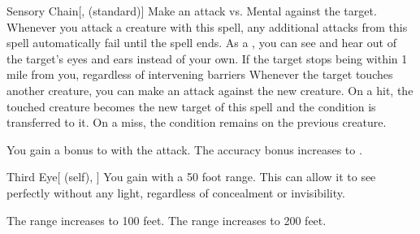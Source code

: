 \lowercase{\hypertarget{spell:Sensory Chain}{}}\label{spell:Sensory Chain}
\begin{freeability}[Rank 4]{\hypertarget{spell:Sensory Chain}{Sensory Chain}}[,  (standard)]
Make an attack vs. Mental against the target.
Whenever you attack a creature with this spell, any additional attacks from this spell automatically fail until the spell ends.
\hit As a , you can see and hear out of the target's eyes and ears instead of your own.
If the target stops being within 1 mile from you, regardless of intervening barriers
Whenever the target touches another creature, you can make an attack against the new creature.
On a hit, the touched creature becomes the new target of this spell and the condition is transferred to it.
On a miss, the condition remains on the previous creature.


\rankline
{} You gain a  bonus to  with the attack.
 The accuracy bonus increases to .

\end{freeability}
\vspace{0.25em}



\lowercase{\hypertarget{spell:Third Eye}{}}\label{spell:Third Eye}
\begin{attuneability}[Rank 4]{\hypertarget{spell:Third Eye}{Third Eye}}[ (self), ]
You gain  with a 50 foot range.
This can allow it to see perfectly without any light, regardless of concealment or invisibility.

\rankline
{} The range increases to 100 feet.
 The range increases to 200 feet.

\end{attuneability}
\vspace{0.25em}



